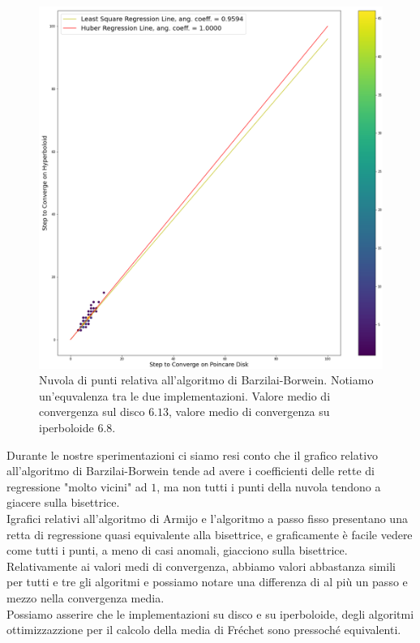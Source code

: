 \documentclass[a4paper, 12pt]{article}
\begin{document}
\begin{figure}[H] %
    \centering\includegraphics[width=1\textwidth]{barzilai_borwein.png}
    \caption{Nuvola di punti relativa all'algoritmo di Barzilai-Borwein. Notiamo un'equvalenza tra le due implementazioni. Valore medio di convergenza sul disco $6.13$, valore medio di convergenza su iperboloide $6.8$.}
\end{figure}
Durante le nostre sperimentazioni ci siamo resi conto che il grafico relativo all'algoritmo di Barzilai-Borwein tende ad avere i coefficienti delle rette di regressione "molto vicini" ad $1$, ma non tutti i punti della nuvola tendono a giacere sulla bisettrice.\\
Igrafici relativi all'algoritmo di Armijo e l'algoritmo a passo fisso presentano una retta di regressione quasi equivalente alla bisettrice, e graficamente è facile vedere come tutti i punti, a meno di casi anomali, giacciono sulla bisettrice. Relativamente ai valori medi di convergenza, abbiamo valori abbastanza simili per tutti e tre gli algoritmi e possiamo notare una differenza di al più un passo e mezzo nella convergenza media.\\
Possiamo asserire che le implementazioni su disco e su iperboloide, degli algoritmi ottimizzazzione per il calcolo della media di Fréchet sono pressoché equivalenti.\\
\end{document}
